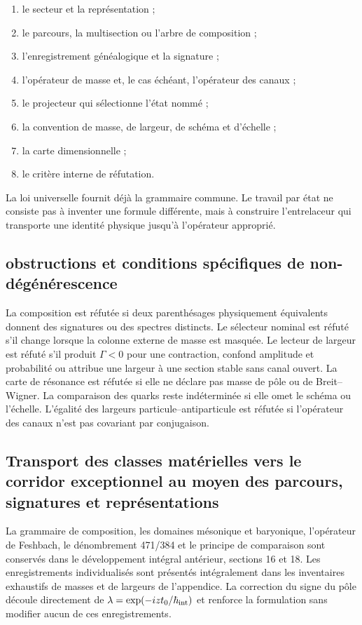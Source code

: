 \begin{enumerate}
\item le secteur et la représentation ;
\item le parcours, la multisection ou l'arbre de composition ;
\item l'enregistrement généalogique et la signature ;
\item l'opérateur de masse et, le cas échéant, l'opérateur des canaux ;
\item le projecteur qui sélectionne l'état nommé ;
\item la convention de masse, de largeur, de schéma et d'échelle ;
\item la carte dimensionnelle ;
\item le critère interne de réfutation.
\end{enumerate}
La loi universelle fournit déjà la grammaire commune. Le travail par état ne consiste pas à inventer une formule différente, mais à construire l'entrelaceur qui transporte une identité physique jusqu'à l'opérateur approprié.

\subsection{obstructions et conditions spécifiques de non-dégénérescence}
La composition est réfutée si deux parenthésages physiquement équivalents donnent des signatures ou des spectres distincts. Le sélecteur nominal est réfuté s'il change lorsque la colonne externe de masse est masquée. Le lecteur de largeur est réfuté s'il produit \(\Gamma<0\) pour une contraction, confond amplitude et probabilité ou attribue une largeur à une section stable sans canal ouvert. La carte de résonance est réfutée si elle ne déclare pas masse de pôle ou de Breit--Wigner. La comparaison des quarks reste indéterminée si elle omet le schéma ou l'échelle. L'égalité des largeurs particule--antiparticule est réfutée si l'opérateur des canaux n'est pas covariant par conjugaison.

\subsection{Transport des classes matérielles vers le corridor exceptionnel au moyen des parcours, signatures et représentations}
La grammaire de composition, les domaines mésonique et baryonique, l'opérateur de Feshbach, le dénombrement 471/384 et le principe de comparaison sont conservés dans le développement intégral antérieur, sections 16 et 18. Les enregistrements individualisés sont présentés intégralement dans les inventaires exhaustifs de masses et de largeurs de l'appendice. La correction du signe du pôle découle directement de \(\lambda=\exp(-izt_0/\hbar_{\rm int})\) et renforce la formulation sans modifier aucun de ces enregistrements.

